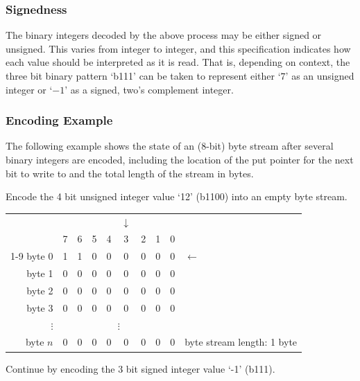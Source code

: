 \documentclass[11pt,letterpaper]{article}
\begin{document}
\subsubsection{Signedness}

The binary integers decoded by the above process may be either signed or
 unsigned.
This varies from integer to integer, and this specification
 indicates how each value should be interpreted as it is read.
That is, depending on context, the three bit binary pattern `b111' can be taken
 to represent either `$7$' as an unsigned integer or `$-1$' as a signed, two's
 complement integer.

\subsubsection{Encoding Example}

The following example shows the state of an (8-bit) byte stream after several
 binary integers are encoded, including the location of the put pointer for the
 next bit to write to and the total length of the stream in bytes.

Encode the 4 bit unsigned integer value `12' (b1100) into an empty byte stream.

\begin{tabular}{rccccccccl}
                    &   &   &   &   &$\downarrow$&&&&            \\
        \hfill\vline& 7 & 6 & 5 & 4 & 3 & 2 & 1 & 0 &            \\\cline{1-9}
byte 0  \hfill\vline& 1 & 1 & 0 & 0 & 0 & 0 & 0 & 0 &$\leftarrow$\\
byte 1  \hfill\vline& 0 & 0 & 0 & 0 & 0 & 0 & 0 & 0 &            \\
byte 2  \hfill\vline& 0 & 0 & 0 & 0 & 0 & 0 & 0 & 0 &            \\
byte 3  \hfill\vline& 0 & 0 & 0 & 0 & 0 & 0 & 0 & 0 &            \\
\hfill$\vdots$\hfill\vline&\multicolumn{8}{c}{$\vdots$}&         \\
byte $n$\hfill\vline& 0 & 0 & 0 & 0 & 0 & 0 & 0 & 0 &
byte stream length: 1 byte
\end{tabular}
\vspace{\baselineskip}

Continue by encoding the 3 bit signed integer value `-1' (b111).
\end{document}
